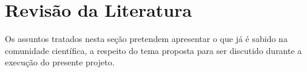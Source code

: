 \chapter{Revisão da Literatura}
Os assuntos tratados nesta seção pretendem apresentar o que já é sabido na comunidade científica, a respeito do tema proposta para ser discutido durante a execução do presente projeto. 

